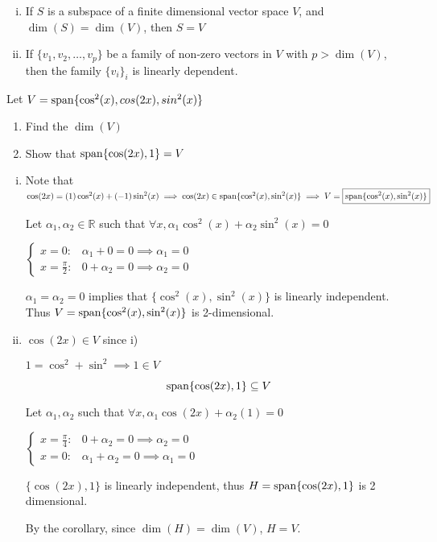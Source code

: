 \begin{corollary}
	\begin{enumerate}[i)]
		\item If $S$ is a subspace of a finite dimensional vector space $V$, and $\dim(S) = \dim(V)$, then $S = V$
		
		\item If $\{v_1, v_2, \ldots, v_p\}$ be a family of non-zero vectors in $V$ with $p > \dim(V)$, then the family $\{v_i\}_i$ is linearly dependent.
	\end{enumerate}
\end{corollary}

\begin{example}
	Let $V = \mathrm{span}\{\cos^2(x), cos(2x), sin^2(x)\}$

	\begin{enumerate}
		\item Find  the $\dim(V)$
		\item Show that $\mathrm{span}\{\cos(2x), 1\} = V$
	\end{enumerate}
\end{example}

\begin{sol}
	\begin{enumerate}[i)]
		\item Note that $\cos(2x) = (1)\cos^2(x) + (-1) \sin^2(x) \implies \cos(2x) \in \mathrm{span}\{\cos^2(x), \sin^2(x)\} \implies V = \boxed{\mathrm{span}\{\cos^2(x), \sin^2(x)\}}$

		Let $\alpha_1, \alpha_2 \in \mathbb{R}$ such that $\forall x, \alpha_1 \cos^2(x) + \alpha_2 \sin^2(x) = 0$

		$\begin{cases}
			x = 0:& \alpha_1 + 0 = 0 \implies \alpha_1 = 0\\
			x = \frac{\pi}{2}:& 0 + \alpha_2 = 0 \implies \alpha_2 = 0
		\end{cases}$

		$\alpha_1 = \alpha_2 = 0$ implies that $\{\cos^2(x), \sin^2(x)\}$ is linearly independent. Thus $V = \mathrm{span}\{\cos^2(x), \sin^2(x)\}$ is 2-dimensional.

		\item $\cos(2x) \in V$ since i)
		
		$1 = \cos^2 + \sin^2 \implies \boxed{1 \in V}$

		\[\mathrm{span}\{\cos(2x), 1\} \subseteq V\]

		Let $\alpha_1, \alpha_2$ such that $\forall x, \alpha_1 \cos(2x) + \alpha_2 (1) = 0$

		$\begin{cases}
			x = \frac{\pi}{4}:& 0 + \alpha_2 = 0 \implies \alpha_2 = 0\\
			x = 0:& \alpha_1 + \alpha_2 = 0 \implies \alpha_1 = 0
		\end{cases}$

		$\{\cos(2x), 1\}$ is linearly independent, thus $H = \mathrm{span}\{\cos(2x), 1\}$ is 2 dimensional.

		By the corollary, since $\dim(H) = \dim(V)$, $H = V$.
	\end{enumerate}
\end{sol}

